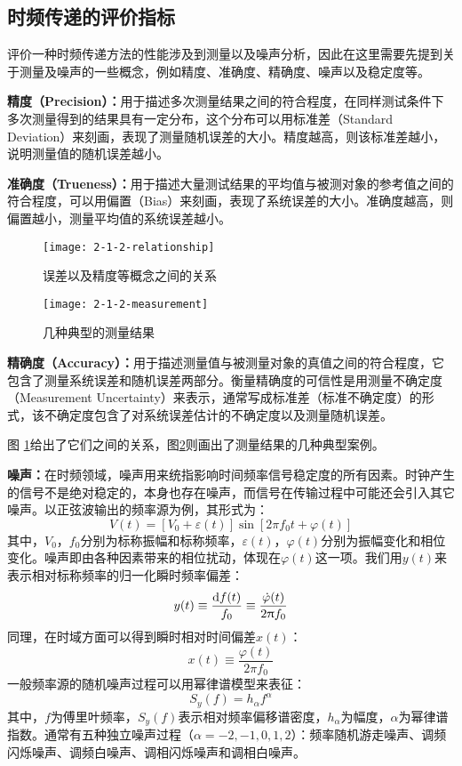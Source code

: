 \subsection{时频传递的评价指标}
评价一种时频传递方法的性能涉及到测量以及噪声分析，因此在这里需要先提到关于测量及噪声的一些概念，例如精度、准确度、精确度、噪声以及稳定度等。

\textbf{精度（Precision）：}用于描述多次测量结果之间的符合程度，在同样测试条件下多次测量得到的结果具有一定分布，这个分布可以用标准差（Standard Deviation）来刻画，表现了测量随机误差的大小。精度越高，则该标准差越小，说明测量值的随机误差越小。

\textbf{准确度（Trueness）：}用于描述大量测试结果的平均值与被测对象的参考值之间的符合程度，可以用偏置（Bias）来刻画，表现了系统误差的大小。准确度越高，则偏置越小，测量平均值的系统误差越小。
\begin{figure}[htbp]
\centering
\texttt{[image: 2-1-2-relationship]}
\caption{误差以及精度等概念之间的关系}
\label{fig:2-1-2-relationship}
\end{figure}

\begin{figure}[htbp]
\centering
\texttt{[image: 2-1-2-measurement]}
\caption{几种典型的测量结果}
\label{fig:2-1-2-measurement}
\end{figure}

\textbf{精确度（Accuracy）：}用于描述测量值与被测量对象的真值之间的符合程度，它包含了测量系统误差和随机误差两部分。衡量精确度的可信性是用测量不确定度（Measurement Uncertainty）来表示，通常写成标准差（标准不确定度）的形式，该不确定度包含了对系统误差估计的不确定度以及测量随机误差。

图 \ref {fig:2-1-2-relationship}给出了它们之间的关系，图\ref{fig:2-1-2-measurement}则画出了测量结果的几种典型案例。

\textbf{噪声：}在时频领域，噪声用来统指影响时间频率信号稳定度的所有因素。时钟产生的信号不是绝对稳定的，本身也存在噪声，而信号在传输过程中可能还会引入其它噪声。以正弦波输出的频率源为例，其形式为：
\begin{equation}
V(t)=[V_{0}+\varepsilon(t)]\sin [2\pi f_{0}t+\varphi(t)]
\end{equation}
其中，$V_{0}$，$f_{0}$分别为标称振幅和标称频率，$\varepsilon(t)$，$\varphi(t)$分别为振幅变化和相位变化。噪声即由各种因素带来的相位扰动，体现在$\varphi(t)$这一项。我们用$y(t)$来表示相对标称频率的归一化瞬时频率偏差：
\begin{equation}
y(t)\equiv\dfrac{\mathop{}\!\mathrm{d} f(t)}{f_{0}}\equiv\dfrac{\dot{\varphi}(t)}{2\uppi f_{0}}
\end{equation}
同理，在时域方面可以得到瞬时相对时间偏差$x(t)$：
\begin{equation}
x(t) \equiv \dfrac{\varphi(t)}{2\pi f_{0}}
\end{equation}
一般频率源的随机噪声过程可以用幂律谱模型来表征：
\begin{equation}
S_{y}(f)=h_{\alpha}f^{\alpha}
\end{equation}
其中，$f$为傅里叶频率，$S_{y}(f)$表示相对频率偏移谱密度，$h_{\alpha}$为幅度，$\alpha$为幂律谱指数。通常有五种独立噪声过程（$\alpha=-2,-1,0,1,2$）：频率随机游走噪声、调频闪烁噪声、调频白噪声、调相闪烁噪声和调相白噪声。

